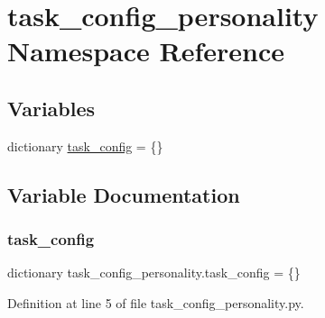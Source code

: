 \hypertarget{namespacetask__config__personality}{}\section{task\+\_\+config\+\_\+personality Namespace Reference}
\label{namespacetask__config__personality}
\subsection*{Variables}
\begin{DoxyCompactItemize}
\item 
dictionary \hyperlink{namespacetask__config__personality_a2934a322fc4f12220f2d9dd5324ff236}{task\+\_\+config} = \{\}
\end{DoxyCompactItemize}


\subsection{Variable Documentation}
\mbox{\label{namespacetask__config__personality_a2934a322fc4f12220f2d9dd5324ff236}} 
\subsubsection{\texorpdfstring{task\+\_\+config}{task\_config}}
{\footnotesize\ttfamily dictionary task\+\_\+config\+\_\+personality.\+task\+\_\+config = \{\}}



Definition at line 5 of file task\+\_\+config\+\_\+personality.\+py.

